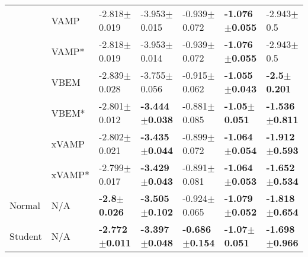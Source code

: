 \begin{tabular}{lllllll}
        & VAMP &           -2.818$\pm$0.019 &           -3.953$\pm$0.015 &           -0.939$\pm$0.072 &  \textbf{-1.076$\pm$0.055} &             -2.943$\pm$0.5 \\
        & VAMP* &           -2.818$\pm$0.019 &           -3.953$\pm$0.014 &           -0.939$\pm$0.072 &  \textbf{-1.076$\pm$0.055} &             -2.943$\pm$0.5 \\
        & VBEM &           -2.839$\pm$0.028 &           -3.755$\pm$0.056 &           -0.915$\pm$0.062 &  \textbf{-1.055$\pm$0.043} &    \textbf{-2.5$\pm$0.201} \\
        & VBEM* &           -2.801$\pm$0.012 &  \textbf{-3.444$\pm$0.038} &           -0.881$\pm$0.085 &   \textbf{-1.05$\pm$0.051} &  \textbf{-1.536$\pm$0.811} \\
        & xVAMP &           -2.802$\pm$0.021 &  \textbf{-3.435$\pm$0.044} &           -0.899$\pm$0.072 &  \textbf{-1.064$\pm$0.054} &  \textbf{-1.912$\pm$0.593} \\
        & xVAMP* &           -2.799$\pm$0.017 &  \textbf{-3.429$\pm$0.043} &           -0.891$\pm$0.081 &  \textbf{-1.064$\pm$0.053} &  \textbf{-1.652$\pm$0.534} \\
Normal & N/A &    \textbf{-2.8$\pm$0.026} &  \textbf{-3.505$\pm$0.102} &           -0.924$\pm$0.065 &  \textbf{-1.079$\pm$0.052} &  \textbf{-1.818$\pm$0.654} \\
Student & N/A &  \textbf{-2.772$\pm$0.011} &  \textbf{-3.397$\pm$0.048} &  \textbf{-0.686$\pm$0.154} &   \textbf{-1.07$\pm$0.051} &  \textbf{-1.698$\pm$0.966} \\
\bottomrule
\end{tabular}

